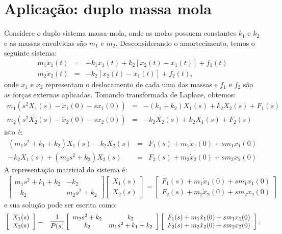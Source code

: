 \section{Aplicação: duplo massa mola}
Considere o duplo sistema massa-mola, onde as molas possuem constantes $k_1$ e $k_2$ e as massas envolvidas são $m_1$ e $m_2$. Desconsiderando o amortecimento, temos o seguinte sistema:
\begin{eqnarray*}
 m_1 \ddot{x}_1(t) &=&  - k_1 x_1(t) + k_2\left[x_2(t)-x_1(t)\right]+f_1(t)\\
 m_2 \ddot{x}_2(t) &=&  - k_2\left[x_2(t)-x_1(t)\right]+f_2(t),
\end{eqnarray*}
onde $x_1$ e $x_2$ representam o deslocamento de cada uma das massas e $f_1$ e $f_2$ são as forças externas aplicadas. Tomando transformada de Laplace, obtemos:
\begin{eqnarray*}
 m_1 (s^2X_1(s)-\dot{x}_1(0)-sx_1(0)) &=&  - (k_1+k_2) X_1(s) + k_2X_2(s)+F_1(s)\\
 m_2 (s^2X_2(s)-\dot{x}_2(0)-sx_2(0)) &=&  - k_2X_2(s)+k_2X_1(s)+F_2(s)
\end{eqnarray*}
isto é:
\begin{eqnarray*}
 \left(m_1 s^2+k_1+k_2\right)X_1(s)- k_2X_2(s) &=&   F_1(s)+m_1\dot{x}_1(0)+sm_1x_1(0)\\
 -k_2X_1(s)+\left(m_2 s^2+k_2\right)X_2(s) &=&  F_2(s)+m_2\dot{x}_2(0)+sm_2x_2(0)
\end{eqnarray*}
A representação matricial do sistema é:
\begin{eqnarray*}
\left[\begin{array}{cc}
       m_1 s^2+k_1+k_2 &- k_2\\
 -k_2&      m_2 s^2+k_2
      \end{array}
\right]
\left[\begin{array}{c}
       X_1(s)\\
       X_2(s)
      \end{array}
\right]=\left[\begin{array}{c}
F_1(s)+m_1\dot{x}_1(0)+sm_1x_1(0)\\  
F_2(s)+m_2\dot{x}_2(0)+sm_2x_2(0)
       \end{array}
\right]
\end{eqnarray*}
e sua solução pode ser escrita como:
\begin{eqnarray}{\label{eq_transf_2_massa_mola}}
\left[\begin{array}{c}
       X_1(s)\\
       X_2(s)
      \end{array}
\right]
&=&\frac{1}{P(s)}
\left[\begin{array}{cc}
       m_2s^2+k_2 & k_2\\
 k_2&      m_1 s^2+k_1+k_2
      \end{array}
\right]
\left[\begin{array}{c}
F_1(s)+m_1\dot{x}_1(0)+sm_1x_1(0)\\  
F_2(s)+m_2\dot{x}_2(0)+sm_2x_2(0)
       \end{array}
\right],
\end{eqnarray}
